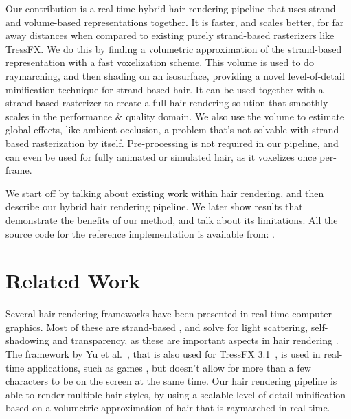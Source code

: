 \documentclass{egpubl}
\begin{document}

Our contribution is a real-time hybrid hair rendering pipeline that uses strand- and volume-based representations together. It is faster, and scales better, for far away distances when compared to existing purely strand-based rasterizers like TressFX. We do this by finding a volumetric approximation of the strand-based representation with a fast voxelization scheme. This volume is used to do raymarching, and then shading on an isosurface, providing a novel level-of-detail minification technique for strand-based hair. It can be used together with a strand-based rasterizer to create a full hair rendering solution that smoothly scales in the performance \& quality domain. We also use the volume to estimate global effects, like ambient occlusion, a problem that's not solvable with strand-based rasterization by itself. Pre-processing is not required in our pipeline, and can even be used for fully animated or simulated hair, as it voxelizes once per-frame.



We start off by talking about existing work within hair rendering, and then describe our hybrid hair rendering pipeline. We later show results that demonstrate the benefits of our method, and talk about its limitations. All the source code for the reference implementation is available from: .

\section{Related Work} \label{sec:related_work}


Several hair rendering frameworks have been presented in real-time computer graphics. Most of these are strand-based \cite{yu2012framework}, and solve for light scattering, self-shadowing and transparency, as these are important aspects in hair rendering \cite{ward2007survey}. The framework by Yu et al.~\cite{yu2012framework}, that is also used for TressFX 3.1~\cite{martin2014tressfx}, is used in real-time applications, such as games \cite{lacroix2013tressfx, steward2015augmented}, but doesn't allow for more than a few characters to be on the screen at the same time. Our hair rendering pipeline is able to render multiple hair styles, by using a scalable level-of-detail minification based on a volumetric approximation of hair that is raymarched in real-time.
\end{document}
